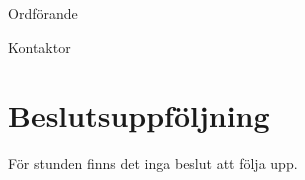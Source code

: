 \documentclass[10pt]{article}
\def\ordf{Fredrik Peterson}
\def\sekr{Erik Månsson}
\begin{document}
\begin{signatures}{2}
    \ist
    \signature{\ordf}{Ordförande}
    \signature{\sekr}{Kontaktor}
\end{signatures}

\section{Beslutsuppföljning}
För stunden finns det inga beslut att följa upp.

\begin{comment}
\begin{busek}
    \beslutsek{VT/15}{Ett beslut}{Några personer}{...}
\end{busek}
\end{comment}

\begin{utskottsrapporter}
    
    
    
    
    
    
    
    
    
    
\end{utskottsrapporter}

\begin{valforslags}
    
\end{valforslags}

\begin{berattelser}
    
    
    
    
    
    
    
    
    
    
    
\end{berattelser}

\begin{stadgeandringar}
\end{stadgeandringar}

\begin{motioner}
    
    
    
    
    
    
    
    
\end{motioner}
\end{document}
